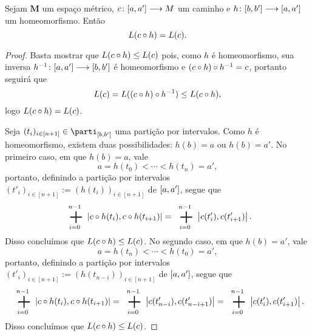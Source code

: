 \begin{proposition}
Sejam $\bm M$ um espaço métrico, ${c}\colon {\left[{a},{a'}\right]} \longrightarrow {M}$ um caminho e ${h}\colon {\left[{b},{b'}\right]} \longrightarrow {\left[{a},{a'}\right]}$ um homeomorfismo. Então
	\begin{equation*}
	L(c \circ h) = L(c).
	\end{equation*}
\end{proposition}
\begin{proof}
Basta mostrar que $L(c \circ h) \leq L(c)$ pois, como $h$ é homeomorfismo, sua inversa ${h^{-1}}\colon {\left[{a},{a'}\right]} \longrightarrow {\left[{b},{b'}\right]}$ é homeomorfismo e $(c \circ h) \circ h^{-1} = c$, portanto seguirá que
	\begin{equation*}
	L(c) = L((c \circ h) \circ h^{-1}) \leq L(c \circ h),
	\end{equation*}
logo $L(c \circ h) = L(c)$.

Seja $(t_i)_{i \in [n+1]} \in \parti_{\intff{b}{b'}}$ uma partição por intervalos. Como $h$ é homeomorfismo, existem duas possibilidades: $h(b)=a$ ou $h(b)=a'$. No primeiro caso, em que $h(b)=a$, vale
	\begin{equation*}
	a = h(t_0) < \cdots < h(t_n) = a',
	\end{equation*}
portanto, definindo a partição por intervalos $(t'_i)_{i \in [n+1]} := (h(t_i))_{i \in [n+1]}$ de $\left[{a},{a'}\right]$, segue que
	\begin{equation*}
	\sum_{i=0}^{n-1} \dist{c\circ h(t_i)}{c \circ h(t_{i+1})} = \sum_{i=0}^{n-1} \dist{c(t'_i)}{c(t'_{i+1})}.
	\end{equation*}
Disso concluímos que $L(c \circ h) \leq L(c)$. No segundo caso, em que $h(b)=a'$, vale
	\begin{equation*}
	a = h(t_n) < \cdots < h(t_0) = a',
	\end{equation*}
portanto, definindo a partição por intervalos $(t'_i)_{i \in [n+1]} := (h(t_{n-i}))_{i \in [n+1]}$ de $\left[{a},{a'}\right]$, segue que
	\begin{equation*}
	\sum_{i=0}^{n-1} \dist{c\circ h(t_i)}{c \circ h(t_{i+1})} = \sum_{i=0}^{n-1} \dist{c(t'_{n-i})}{c(t'_{n-i+1})} = \sum_{i=0}^{n-1} \dist{c(t'_{i})}{c(t'_{i+1})}.
	\end{equation*}
Disso concluímos que $L(c \circ h) \leq L(c)$.
\end{proof}


